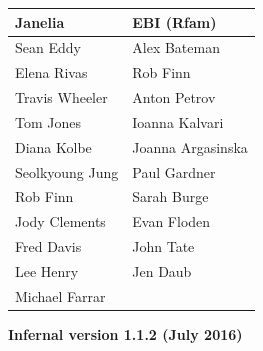 \documentclass[landscape]{slides}
\begin{document}
\begin{slide}
\begin{slide}
\begin{center}
\normalsize
\begin{tabular}{l|l}
\textbf{Janelia} & \textbf{EBI (Rfam)} \\ \hline
Sean Eddy           & Alex Bateman \\
Elena Rivas         & Rob Finn \\
Travis Wheeler      & Anton Petrov \\
Tom Jones           & Ioanna Kalvari \\
Diana Kolbe         & Joanna Argasinska \\
Seolkyoung Jung     & Paul Gardner \\
Rob Finn            & Sarah Burge \\ 
Jody Clements       & Evan Floden \\
Fred Davis          & John Tate \\
Lee Henry           & Jen Daub \\
Michael Farrar      & \\
\end{tabular}


\end{center}

\vfill
\end{slide}
\begin{slide}
\begin{center}
\textbf{Infernal version 1.1.2 (July 2016)} \\
\end{center}


\end{slide}
\end{slide}
\end{document}

